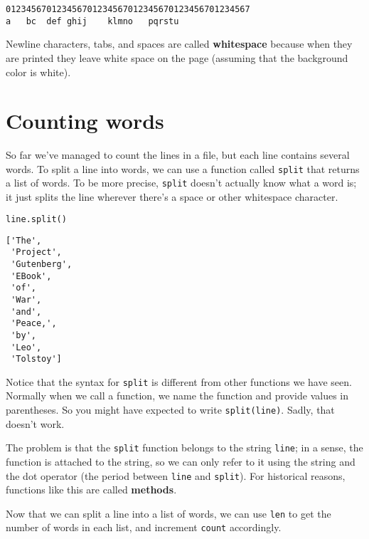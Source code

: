 \begin{lstlisting}[]
012345670123456701234567012345670123456701234567
a   bc  def ghij    klmno   pqrstu
\end{lstlisting}

Newline characters, tabs, and spaces are called \textbf{whitespace}
because when they are printed they leave white space on the page
(assuming that the background color is white).

\hypertarget{counting-words}{%
\section{Counting words}\label{counting-words}}

So far we've managed to count the lines in a file, but each line
contains several words. To split a line into words, we can use a
function called \passthrough{\lstinline!split!} that returns a list of
words. To be more precise, \passthrough{\lstinline!split!} doesn't
actually know what a word is; it just splits the line wherever there's a
space or other whitespace character.

\begin{lstlisting}[language=Python]
line.split()
\end{lstlisting}

\begin{lstlisting}[]
['The',
 'Project',
 'Gutenberg',
 'EBook',
 'of',
 'War',
 'and',
 'Peace,',
 'by',
 'Leo',
 'Tolstoy']
\end{lstlisting}

Notice that the syntax for \passthrough{\lstinline!split!} is different
from other functions we have seen. Normally when we call a function, we
name the function and provide values in parentheses. So you might have
expected to write \passthrough{\lstinline!split(line)!}. Sadly, that
doesn't work.

The problem is that the \passthrough{\lstinline!split!} function belongs
to the string \passthrough{\lstinline!line!}; in a sense, the function
is attached to the string, so we can only refer to it using the string
and the dot operator (the period between \passthrough{\lstinline!line!}
and \passthrough{\lstinline!split!}). For historical reasons, functions
like this are called \textbf{methods}.

Now that we can split a line into a list of words, we can use
\passthrough{\lstinline!len!} to get the number of words in each list,
and increment \passthrough{\lstinline!count!} accordingly.

